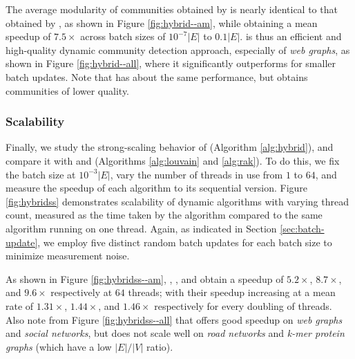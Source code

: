 The average modularity of communities obtained by \FroHyb{} is nearly identical to that obtained by \FroLou{}, as shown in Figure \ref{fig:hybrid--am}, while obtaining a mean speedup of $7.5\times$ across batch sizes of $10^{-7} |E|$ to $0.1 |E|$. \FroHyb{} is thus an efficient and high-quality dynamic community detection approach, especially of \textit{web graphs}, as shown in Figure \ref{fig:hybrid--all}, where it significantly outperforms \FroLou{} for smaller batch updates. Note that \FroLPA{} has about the same performance, but obtains communities of lower quality.


\subsubsection{Scalability}
\label{sec:evaluation--hybridss}

Finally, we study the strong-scaling behavior of \FroHyb{} (Algorithm \ref{alg:hybrid}), and compare it with \FroLou{} and \FroLPA{} (Algorithms \ref{alg:louvain} and \ref{alg:rak}). To do this, we fix the batch size at $10^{-3} |E|$, vary the number of threads in use from $1$ to $64$, and measure the speedup of each algorithm to its sequential version. Figure \ref{fig:hybridss} demonstrates scalability of dynamic algorithms with varying thread count, measured as the time taken by the algorithm compared to the same algorithm running on one thread. Again, as indicated in Section \ref{sec:batch-update}, we employ five distinct random batch updates for each batch size to minimize measurement noise.

As shown in Figure \ref{fig:hybridss--am}, \FroLou{}, \FroLPA{}, and \FroHyb{} obtain a speedup of $5.2\times$, $8.7\times$, and $9.6\times$ respectively at $64$ threads; with their speedup increasing at a mean rate of $1.31\times$, $1.44\times$, and $1.46\times$ respectively for every doubling of threads. Also note from Figure \ref{fig:hybridss--all} that \FroHyb{} offers good speedup on \textit{web graphs} and \textit{social networks}, but does not scale well on \textit{road networks} and \textit{k-mer protein graphs} (which have a low $|E|/|V|$ ratio).




